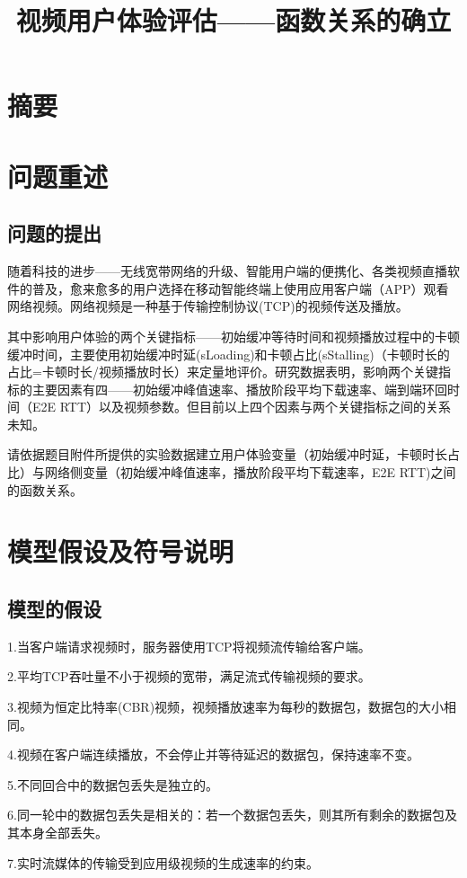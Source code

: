 \documentclass[UTF8]{ctexart}
\title{视频用户体验评估——函数关系的确立}
\begin{document}
\maketitle
\section{摘要}
\section{问题重述}
\subsection{问题的提出}
随着科技的进步——无线宽带网络的升级、智能用户端的便携化、各类视频直播软件的普及，愈来愈多的用户选择在移动智能终端上使用应用客户端（APP）观看网络视频。网络视频是一种基于传输控制协议(TCP)的视频传送及播放。

其中影响用户体验的两个关键指标——初始缓冲等待时间和视频播放过程中的卡顿缓冲时间，主要使用初始缓冲时延(sLoading)和卡顿占比(sStalling)（卡顿时长的占比=卡顿时长/视频播放时长）来定量地评价。研究数据表明，影响两个关键指标的主要因素有四——初始缓冲峰值速率、播放阶段平均下载速率、端到端环回时间（E2E RTT）以及视频参数。但目前以上四个因素与两个关键指标之间的关系未知。

请依据题目附件所提供的实验数据建立用户体验变量（初始缓冲时延，卡顿时长占比）与网络侧变量（初始缓冲峰值速率，播放阶段平均下载速率，E2E RTT)之间的函数关系。
	
\section{模型假设及符号说明}
\subsection{模型的假设}
1.当客户端请求视频时，服务器使用TCP将视频流传输给客户端。

2.平均TCP吞吐量不小于视频的宽带，满足流式传输视频的要求。

3.视频为恒定比特率(CBR)视频，视频播放速率为每秒的数据包，数据包的大小相同。

4.视频在客户端连续播放，不会停止并等待延迟的数据包，保持速率不变。

5.不同回合中的数据包丢失是独立的。

6.同一轮中的数据包丢失是相关的：若一个数据包丢失，则其所有剩余的数据包及其本身全部丢失。

7.实时流媒体的传输受到应用级视频的生成速率的约束。
\end{document}
